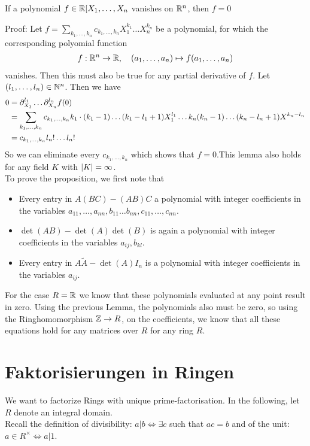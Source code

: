 \begin{lemma}[]
	If a polynomial $f \in \mathbb{R}[X_{1}, \ldots, X_{n}$ vanishes on $\mathbb{R}^n$, then $f = 0$
\end{lemma}
Proof: Let $f = \sum_{k_{1}, \ldots, k_{n}}c_{k_{1}, \ldots, k_{n}}X_1^{k_1} \dots X_n^{k_n}$ be a polynomial, for which the corresponding polyomial function
\begin{align*}
	f: \mathbb{R}^n \to \mathbb{R}, \quad (a_{1}, \ldots, a_{n}) \mapsto f(a_{1}, \ldots, a_{n})
\end{align*}
vanishes. Then this must also be true for any partial derivative of $f$. Let $(l_{1}, \ldots, l_{n}) \in \mathbb{N}^n$. Then we have
\begin{align*}
	0 &= \partial_{X_1}^{l_1} \dots \partial_{X_n}^{l_n}f(0) \\
		&= \sum_{k_{1}, \ldots, k_{n}}c_{k_{1}, \ldots, k_{n}}k_1 \cdot(k_1 -1) \dots (k_1 - l_1 + 1)X_1^{l_1} \dots k_n(k_n-1) \dots (k_n - l_n + 1)X^{k_n - l_n}\\
		&= c_{k_{1}, \ldots, k_{n}}l_n! \dots l_n!
\end{align*}
So we can eliminate every $c_{k_{1}, \ldots, k_{n}}$ which shows that $f = 0$.This lemma also holds for any field $K$ with $\vert K\vert = \infty$.\\

To prove the proposition, we first note that
\begin{itemize}
	\item 	Every entry in $A(BC) - (AB)C$ a polynomial with integer coefficients in the variables $a_{11}, \ldots, a_{nn}, b_{11} \ldots b_{nn}, c_{11}, \ldots, c_{nn}$.
	\item $\det(AB) - \det(A) \det(B)$ is again a polynomial with integer coefficients in the variables $a_{ij},b_{kl}$.
	\item 	Every entry in $A \tilde{A} - \det(A) I_n$ is a polynomial with integer coefficients in the variables $a_{ij}$.\\
\end{itemize}
For the case $R = \mathbb{R}$ we know that these polynomials evaluated at any point result in zero. Using the previous Lemma, the polynomials also must be zero, so using the Ringhomomorphism $\mathbb{Z} \to R$, on the coefficients, we know that all these equations hold for any matrices over $R$ for any ring $R$.



\section{Faktorisierungen in Ringen}
We want to factorize Rings with unique prime-factorisation. In the following, let $R$ denote an integral domain.\\
Recall the definition of divisibility: $a | b \iff \exists c$ such that $ac = b$ and of the unit: $a \in R^{\times} \iff a|1$.\\

